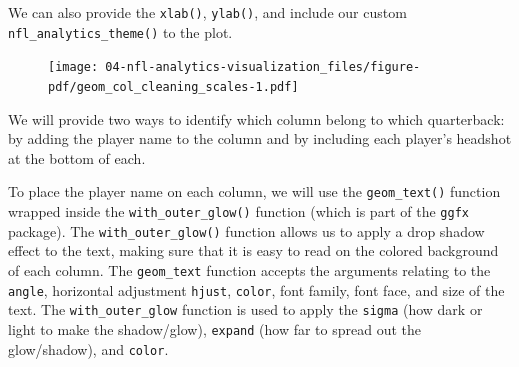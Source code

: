 \documentclass[
  letterpaper,
]{krantz}
\newenvironment{Shaded}{\begin{snugshade}}{\end{snugshade}}
\newcommand{\AttributeTok}[1]{\textcolor[rgb]{0.40,0.45,0.13}{#1}}
\newcommand{\DecValTok}[1]{\textcolor[rgb]{0.68,0.00,0.00}{#1}}
\newcommand{\FunctionTok}[1]{\textcolor[rgb]{0.28,0.35,0.67}{#1}}
\newcommand{\NormalTok}[1]{\textcolor[rgb]{0.00,0.23,0.31}{#1}}
\newcommand{\SpecialCharTok}[1]{\textcolor[rgb]{0.37,0.37,0.37}{#1}}
\newcommand{\StringTok}[1]{\textcolor[rgb]{0.13,0.47,0.30}{#1}}
\begin{document}
We can also provide the \texttt{xlab()}, \texttt{ylab()}, and include
our custom \texttt{nfl\_analytics\_theme()} to the plot.

\begin{Shaded}
\end{Shaded}

\begin{figure}[H]

{\centering \texttt{[image: 04-nfl-analytics-visualization\_files/figure-pdf/geom\_col\_cleaning\_scales-1.pdf]}

}

\end{figure}

We will provide two ways to identify which column belong to which
quarterback: by adding the player name to the column and by including
each player's headshot at the bottom of each.

To place the player name on each column, we will use the
\texttt{geom\_text()} function wrapped inside the
\texttt{with\_outer\_glow()} function (which is part of the
\texttt{ggfx} package). The \texttt{with\_outer\_glow()} function allows
us to apply a drop shadow effect to the text, making sure that it is
easy to read on the colored background of each column. The
\texttt{geom\_text} function accepts the arguments relating to the
\texttt{angle}, horizontal adjustment \texttt{hjust}, \texttt{color},
font family, font face, and size of the text. The
\texttt{with\_outer\_glow} function is used to apply the \texttt{sigma}
(how dark or light to make the shadow/glow), \texttt{expand} (how far to
spread out the glow/shadow), and \texttt{color}.
\end{document}
